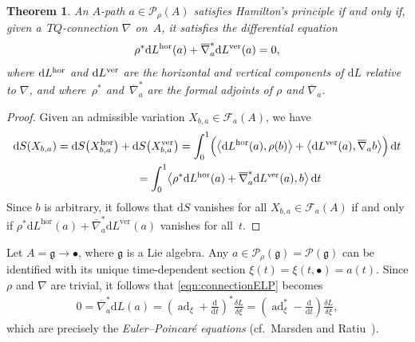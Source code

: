 \documentclass[pdftex]{sigma}
\numberwithin{equation}{section}
\newtheorem{Theorem}{Theorem}[section]
\begin{document}
\begin{Theorem} \label{thm:connectionELP}
An $A$-path $ a \in \mathcal{P} _\rho (A) $ satisfies Hamilton's principle if and only if, given a~$ T Q $-connection $ \nabla $ on~$A$, it satisfies the differential equation
 \begin{gather}\label{eqn:connectionELP}
 \rho ^\ast \mathrm{d} L ^\textup{hor} (a) + \overline{ \nabla }_a ^\ast \mathrm{d} L ^\textup{ver} (a) = 0 ,
 \end{gather}
 where $ \mathrm{d} L ^\textup{hor} $ and $ \mathrm{d} L ^\textup{ver} $ are the horizontal and vertical components of $ \mathrm{d} L $ relative to $ \nabla $, and where~$ \rho ^\ast $ and~$ \overline{ \nabla } _a ^\ast $ are the formal adjoints of $ \rho $ and $ \overline{ \nabla } _a $.
\end{Theorem}

\begin{proof} Given an admissible variation $ X _{ b, a } \in \mathcal{F} _a (A) $, we have
 \begin{gather*}
 \mathrm{d} S ( X _{ b, a } ) = \mathrm{d} S \big( X _{ b, a } ^\text{hor} \big) + \mathrm{d} S \big( X _{ b, a } ^\text{ver} \big)
= \int _0 ^1 \Bigl( \bigl\langle \mathrm{d} L ^\text{hor} (a) , \rho (b) \bigr\rangle + \bigl\langle \mathrm{d} L ^\text{ver} (a)
 , \overline{ \nabla } _a b \bigr\rangle \Bigr) \,\mathrm{d}t \\
\hphantom{\mathrm{d} S ( X _{ b, a } )}{} = \int _0 ^1 \bigl\langle \rho ^\ast \mathrm{d} L ^\text{hor} (a)
 + \overline{ \nabla } _a ^\ast \mathrm{d} L ^\text{ver} (a) , b \bigr\rangle \,\mathrm{d}t
 \end{gather*}
 Since $b$ is arbitrary, it follows that $ \mathrm{d} S $ vanishes for all $ X _{ b, a } \in \mathcal{F} _a (A) $ if and only if $ \rho ^\ast \mathrm{d} L ^\text{hor} (a) + \overline{ \nabla } _a ^\ast \mathrm{d} L ^\text{ver} (a) $ vanishes for all~$t$.
\end{proof}

\begin{Example} \label{ex:algebraELP}
Let $ A = \mathfrak{g} \rightarrow \bullet $, where $ \mathfrak{g} $ is a Lie algebra. Any $ a \in \mathcal{P} _\rho (\mathfrak{g} ) = \mathcal{P} (\mathfrak{g} ) $ can be identif\/ied with its unique time-dependent section $ \xi (t) = \xi ( t, \bullet ) = a (t) $. Since $ \rho $ and $ \nabla $ are trivial, it follows that \eqref{eqn:connectionELP} becomes
 \begin{gather*}
 0 = \overline{ \nabla } _a ^\ast \mathrm{d} L (a) = \left( \operatorname{ad} _\xi + \frac{\mathrm{d}}{\mathrm{d}t}
 \right) ^\ast \frac{ \delta L }{ \delta \xi } = \left( \operatorname{ad} _\xi ^\ast - \frac{\mathrm{d}}{\mathrm{d}t} \right) \frac{ \delta L }{ \delta \xi },
 \end{gather*}
 which are precisely the \emph{Euler--Poincar\'e equations} (cf.\ Marsden and Ratiu~\cite[Chapter~13]{MaRa1999}).
\end{Example}
\end{document}
